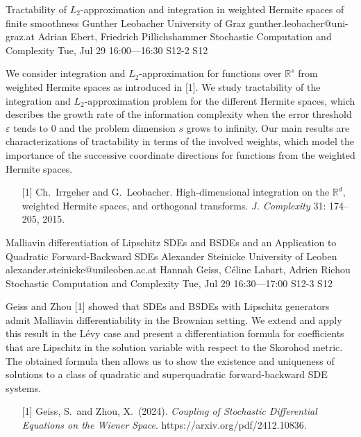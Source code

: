 \begin{talk}
  {Tractability of $L_2$-approximation and integration in weighted Hermite spaces of finite smoothness}%
  {Gunther Leobacher}%
  {University of Graz}%
  {gunther.leobacher@uni-graz.at}%
  {Adrian Ebert, Friedrich Pillichshammer}%
  {Stochastic Computation and Complexity}%
  {Tue, Jul 29 16:00---16:30}%
  {S12-2}%
  {S12}%
    
   

We consider integration and $L_2$-approximation for functions over $\mathbb R^s$ from weighted Hermite spaces as introduced in [1]. We study tractability of the integration and $L_2$-approximation problem for the different Hermite spaces, which describes the growth rate of the information complexity when the error threshold $\varepsilon$ tends to 0 and the problem dimension $s$ grows to infinity. Our main results are characterizations of tractability in terms of the involved weights, which  model the importance of the successive coordinate directions for functions from the weighted Hermite spaces.

\medskip

\begin{enumerate}
 \item[{[1]}] Ch.~Irrgeher and G.~Leobacher. High-dimensional integration on the $\mathbb R^d$, weighted Hermite spaces, and orthogonal transforms. \textit{J. Complexity} 31: 174--205, 2015. 
\end{enumerate}


\end{talk}

\begin{talk}
  {Malliavin differentiation of Lipschitz SDEs and BSDEs and an Application to Quadratic Forward-Backward SDEs}%
  {Alexander Steinicke}%
  {University of Leoben}%
  {alexander.steinicke@unileoben.ac.at}%
  {Hannah Geiss, C\'eline Labart, Adrien Richou}%
  {Stochastic Computation and Complexity}%
  {Tue, Jul 29 16:30---17:00}%
  {S12-3}%
  {S12}%
    
   
Geiss and Zhou [1] showed that SDEs and BSDEs with Lipschitz generators admit Malliavin differentiability in the Brownian setting. We extend and apply this result in the L\'evy case and present a differentiation formula for coefficients that are Lipschitz in the solution variable with respect to the Skorohod metric. The obtained formula then allows us to show the existence and uniqueness of solutions to a class of quadratic and superquadratic forward-backward SDE systems.

\medskip

\begin{enumerate}
 \item[{[1]}] Geiss, S.~and Zhou, X.~(2024). {\it Coupling of Stochastic Differential Equations on the Wiener Space}. https://arxiv.org/pdf/2412.10836.
\end{enumerate}

\end{talk}

